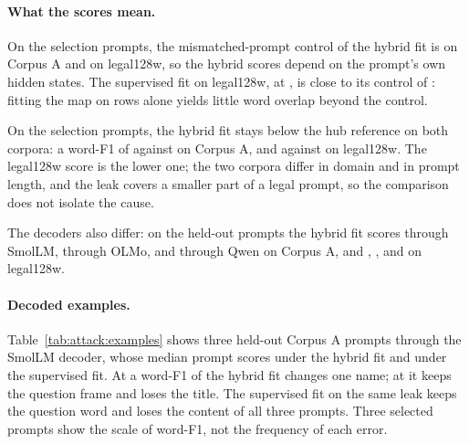 \paragraph{What the scores mean.} On the selection prompts, the mismatched-prompt control of the hybrid fit is  on Corpus A and  on legal128w, so the hybrid scores depend on the prompt's own hidden states. %
The supervised fit on legal128w, at , is close to its control of : fitting the map on  rows alone yields little word overlap beyond the control. %

On the selection prompts, the hybrid fit stays below the hub reference on both corpora: a word-F1 of  against  on Corpus A, and  against  on legal128w.
The legal128w score is the lower one; the two corpora differ in domain and in prompt length, and the leak covers a smaller part of a legal prompt, so the comparison does not isolate the cause.

The decoders also differ: on the held-out prompts the hybrid fit scores  through SmolLM,  through OLMo, and  through Qwen on Corpus A, and , , and  on legal128w. %

\paragraph{Decoded examples.} Table~\ref{tab:attack:examples} shows three held-out Corpus A prompts through the SmolLM decoder, whose median prompt scores  under the hybrid fit and  under the supervised fit. %
At a word-F1 of  the hybrid fit changes one name; at  it keeps the question frame and loses the title.
The supervised fit on the same leak keeps the question word and loses the content of all three prompts.
Three selected prompts show the scale of word-F1, not the frequency of each error.

